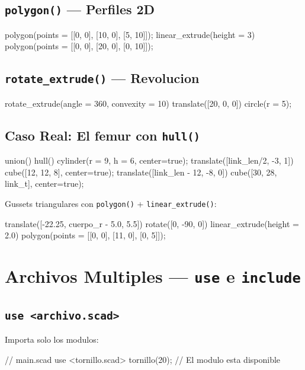 \documentclass[12pt, oneside, a4paper]{report}
\newcommand{\codigo}[1]{\texttt{#1}}
\begin{document}
\section{\codigo{polygon()} --- Perfiles 2D}
\begin{openscad}
polygon(points = [[0, 0], [10, 0], [5, 10]]);
linear_extrude(height = 3) {
    polygon(points = [[0, 0], [20, 0], [0, 10]]);
}
\end{openscad}

\section{\codigo{rotate\_extrude()} --- Revolucion}
\begin{openscad}
rotate_extrude(angle = 360, convexity = 10) {
    translate([20, 0, 0]) circle(r = 5);
}
\end{openscad}

\section{Caso Real: El femur con \codigo{hull()}}
\begin{openscad}
union() {
    hull() {
        cylinder(r = 9, h = 6, center=true);
        translate([link_len/2, -3, 1])
            cube([12, 12, 8], center=true);
    }
    translate([link_len - 12, -8, 0])
        cube([30, 28, link_t], center=true);
}
\end{openscad}

Gussets triangulares con \codigo{polygon()} + \codigo{linear\_extrude()}:
\begin{openscad}
translate([-22.25, cuerpo_r - 5.0, 5.5]) {
    rotate([0, -90, 0])
        linear_extrude(height = 2.0)
            polygon(points = [[0, 0], [11, 0], [0, 5]]);
}
\end{openscad}

\chapter{Archivos Multiples --- \codigo{use} e \codigo{include}}

\section{\codigo{use <archivo.scad>}} Importa solo los modulos:
\begin{openscad}
// main.scad
use <tornillo.scad>
tornillo(20);  // El modulo esta disponible
\end{openscad}
\end{document}
